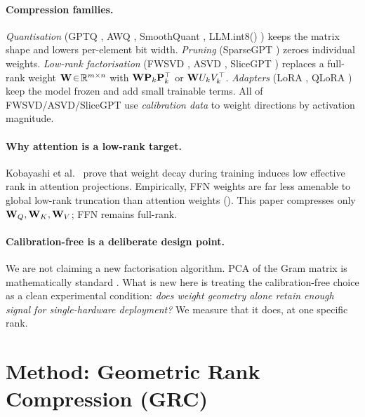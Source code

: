 \documentclass[11pt]{article}
\begin{document}
\paragraph{Compression families.}
\textit{Quantisation} (GPTQ \cite{frantar2022gptq}, AWQ \cite{lin2023awq},
SmoothQuant \cite{xiao2022smoothquant}, LLM.int8() \cite{dettmers2022llmint8})
keeps the matrix shape and lowers per-element bit width.  \textit{Pruning}
(SparseGPT \cite{frantar2023sparsegpt}) zeroes individual weights.
\textit{Low-rank factorisation} (FWSVD \cite{hsu2022fwsvd}, ASVD
\cite{yuan2023asvd}, SliceGPT \cite{ashkboos2024slicegpt}) replaces a
full-rank weight $\mathbf{W}\!\in\!\mathbb{R}^{m\times n}$ with $\mathbf{W}\mathbf{P}_k\mathbf{P}_k^\top$
or $\mathbf{W} U_kV_k^\top$.  \textit{Adapters} (LoRA \cite{hu2021lora},
QLoRA \cite{dettmers2023qlora}) keep the model frozen and add small
trainable terms.  All of FWSVD/ASVD/SliceGPT use \emph{calibration data} to
weight directions by activation magnitude.

\paragraph{Why attention is a low-rank target.}
Kobayashi et al.\ \cite{kobayashi2024lowrankattn} prove that weight decay
during training induces low effective rank in attention projections.
Empirically, FFN weights are far less amenable to global low-rank truncation
than attention weights ().  This paper compresses only
$\mathbf{W}_Q,\mathbf{W}_K,\mathbf{W}_V$; FFN remains full-rank.

\paragraph{Calibration-free is a deliberate design point.}
We are not claiming a new factorisation algorithm.  PCA of the Gram matrix is
mathematically standard \cite{trefethen1997nla,golub2013matrix}.  What is new
here is treating the calibration-free choice as a clean experimental
condition: \emph{does weight geometry alone retain enough signal for
single-hardware deployment?}  We measure that it does, at one specific rank.

\section{Method: Geometric Rank Compression (GRC)}
\label{sec:method}
\end{document}
